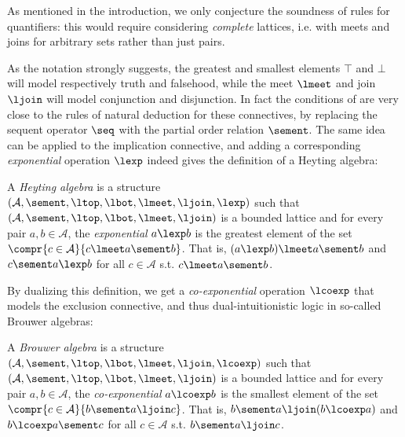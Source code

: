 \begin{remark}
  As mentioned in the introduction, we only conjecture the soundness of rules
  for quantifiers: this would require considering \emph{complete} lattices, i.e.
  with meets and joins for arbitrary sets rather than just pairs.
\end{remark}

As the notation strongly suggests, the greatest and smallest elements $\top$ and
$\bot$ will model respectively truth and falsehood, while the meet $\lmeet$ and
join $\ljoin$ will model conjunction and disjunction. In fact the conditions of
 are very close to the rules of natural deduction for
these connectives, by replacing the sequent operator $\seq$ with the partial
order relation $\sement$. The same idea can be applied to the implication
connective, and adding a corresponding \emph{exponential} operation $\lexp$
indeed gives the definition of a Heyting algebra:

\begin{definition}
  A \emph{Heyting algebra} is a structure $(\mathcal{A}, \sement, \ltop, \lbot,
  \lmeet, \ljoin, \lexp)$ such that $(\mathcal{A}, \sement, \ltop, \lbot,
  \lmeet, \ljoin)$ is a bounded lattice and for every pair $a, b \in
  \mathcal{A}$, the \emph{exponential} $a \lexp b$ is the greatest element of
  the set $\compr{c \in \mathcal{A}}{c \lmeet a \sement b}$. That is, $(a \lexp
  b) \lmeet a \sement b$ and $c \sement a \lexp b$ for all $c \in \mathcal{A}$
  s.t. $c \lmeet a \sement b$.
\end{definition}

By dualizing this definition, we get a \emph{co-exponential} operation $\lcoexp$
that models the exclusion connective, and thus dual-intuitionistic logic in
so-called Brouwer algebras:

\begin{definition}
  A \emph{Brouwer algebra} is a structure $(\mathcal{A}, \sement, \ltop, \lbot,
  \lmeet, \ljoin, \lcoexp)$ such that $(\mathcal{A}, \sement, \ltop, \lbot,
  \lmeet, \ljoin)$ is a bounded lattice and for every pair $a, b \in
  \mathcal{A}$, the \emph{co-exponential} $a \lcoexp b$ is the smallest element
  of the set $\compr{c \in \mathcal{A}}{b \sement a \ljoin c}$. That is, $b
  \sement a \ljoin (b \lcoexp a)$ and $b \lcoexp a \sement c$ for all $c \in
  \mathcal{A}$ s.t. $b \sement a \ljoin c$.
\end{definition}

